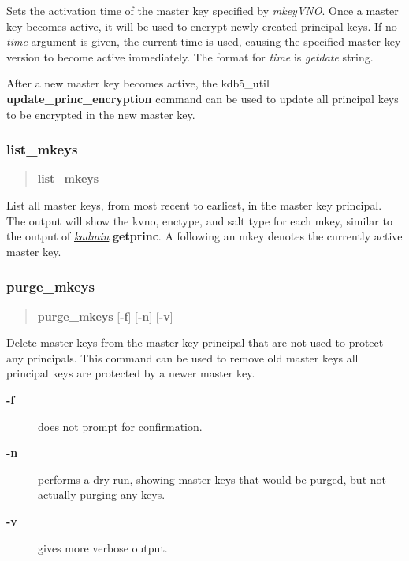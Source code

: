 \documentclass[letterpaper,10pt,english]{sphinxmanual}
\begin{document}
Sets the activation time of the master key specified by \emph{mkeyVNO}.
Once a master key becomes active, it will be used to encrypt newly
created principal keys.  If no \emph{time} argument is given, the current
time is used, causing the specified master key version to become
active immediately.  The format for \emph{time} is \emph{getdate} string.

After a new master key becomes active, the kdb5\_util
\textbf{update\_princ\_encryption} command can be used to update all
principal keys to be encrypted in the new master key.


\subsubsection{list\_mkeys}
\label{admin/admin_commands/kdb5_util:list-mkeys}\begin{quote}

\textbf{list\_mkeys}
\end{quote}

List all master keys, from most recent to earliest, in the master key
principal.  The output will show the kvno, enctype, and salt type for
each mkey, similar to the output of {\hyperref[admin/admin_commands/kadmin_local:kadmin-1]{\emph{kadmin}}} \textbf{getprinc}.  A
\code{*} following an mkey denotes the currently active master key.


\subsubsection{purge\_mkeys}
\label{admin/admin_commands/kdb5_util:purge-mkeys}\begin{quote}

\textbf{purge\_mkeys} {[}\textbf{-f}{]} {[}\textbf{-n}{]} {[}\textbf{-v}{]}
\end{quote}

Delete master keys from the master key principal that are not used to
protect any principals.  This command can be used to remove old master
keys all principal keys are protected by a newer master key.
\begin{description}
\item[{\textbf{-f}}] \leavevmode
does not prompt for confirmation.

\item[{\textbf{-n}}] \leavevmode
performs a dry run, showing master keys that would be purged, but
not actually purging any keys.

\item[{\textbf{-v}}] \leavevmode
gives more verbose output.

\end{description}
\end{document}
